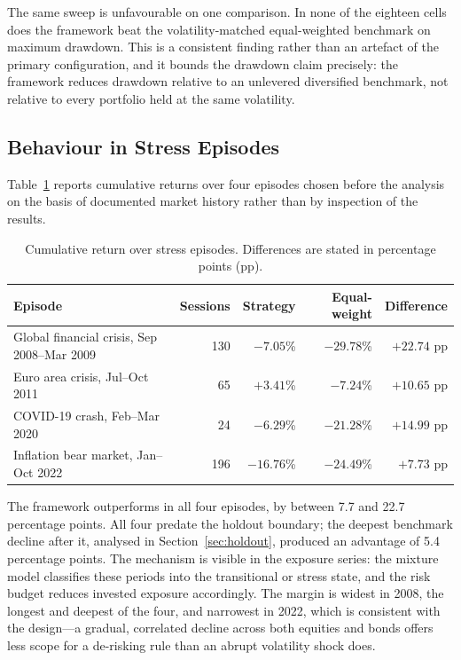 The same sweep is unfavourable on one comparison. In none of the eighteen cells does
the framework beat the volatility-matched equal-weighted benchmark on maximum drawdown.
This is a consistent finding rather than an artefact of the primary configuration, and
it bounds the drawdown claim precisely: the framework reduces drawdown relative to an
unlevered diversified benchmark, not relative to every portfolio held at the same
volatility.

\subsection{Behaviour in Stress Episodes}

Table~\ref{tab:episodes} reports cumulative returns over four episodes chosen before the analysis on the
basis of documented market history rather than by inspection of the results.

\begin{table}[!ht]
\centering
\caption{Cumulative return over stress episodes. Differences are stated in percentage
points (pp).}
\label{tab:episodes}
\small
\begin{tabular}{p{3.6cm}rrrr}
\hline
\textbf{Episode} & \textbf{Sessions} & \textbf{Strategy} & \textbf{Equal-weight} & \textbf{Difference} \\
\hline
Global financial crisis, Sep 2008--Mar 2009 & 130 & $-7.05$\% & $-29.78$\% & $+22.74$ pp \\
Euro area crisis, Jul--Oct 2011 & 65 & $+3.41$\% & $-7.24$\% & $+10.65$ pp \\
COVID-19 crash, Feb--Mar 2020 & 24 & $-6.29$\% & $-21.28$\% & $+14.99$ pp \\
Inflation bear market, Jan--Oct 2022 & 196 & $-16.76$\% & $-24.49$\% & $+7.73$ pp \\
\hline
\end{tabular}
\end{table}

The framework outperforms in all four episodes, by between 7.7 and 22.7 percentage
points. All four predate the holdout boundary; the deepest benchmark decline after it,
analysed in Section~\ref{sec:holdout}, produced an advantage of 5.4 percentage points. The mechanism is visible in the exposure series: the mixture model classifies
these periods into the transitional or stress state, and the risk budget reduces
invested exposure accordingly. The margin is widest in 2008, the longest and deepest of
the four, and narrowest in 2022, which is consistent with the design---a gradual,
correlated decline across both equities and bonds offers less scope for a de-risking
rule than an abrupt volatility shock does.

